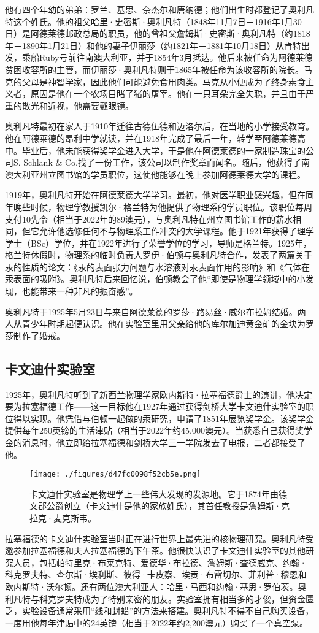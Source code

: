 他有四个年幼的弟弟：罗兰、基思、奈杰尔和唐纳德；他们出生时都登记了奥利凡特这个姓氏。他的祖父哈里·史密斯·奥利凡特（1848年11月7日－1916年1月30日）是阿德莱德邮政总局的职员，他的曾祖父詹姆斯·史密斯·奥利凡特（约1818年－1890年1月21日）和他的妻子伊丽莎（约1821年－1881年10月18日）从肯特出发，乘船Ruby号前往南澳大利亚，并于1854年3月抵达。他后来被任命为阿德莱德贫困收容所的主管，而伊丽莎·奥利凡特则于1865年被任命为该收容所的院长。马克的父母是神智学家，因此他们可能避免食用肉类。马克从小便成为了终身素食主义者，原因是他在一个农场目睹了猪的屠宰。他在一只耳朵完全失聪，并且由于严重的散光和近视，他需要戴眼镜。

奥利凡特最初在家人于1910年迁往古德伍德和迈洛尔后，在当地的小学接受教育。他在阿德莱德的昂利中学就读，并在1918年完成了最后一年，转学至阿德莱德高中。毕业后，他未能获得奖学金进入大学，于是他在阿德莱德的一家制造珠宝的公司S. Schlank & Co.找了一份工作，该公司以制作奖章而闻名。随后，他获得了南澳大利亚州立图书馆的学员职位，这使他能够在晚上参加阿德莱德大学的课程。

1919年，奥利凡特开始在阿德莱德大学学习。最初，他对医学职业感兴趣，但在同年晚些时候，物理学教授凯尔·格兰特为他提供了物理系的学员职位。该职位每周支付10先令（相当于2022年的89澳元），与奥利凡特在州立图书馆工作的薪水相同，但它允许他选修任何不与物理系工作冲突的大学课程。他于1921年获得了理学学士（BSc）学位，并在1922年进行了荣誉学位的学习，导师是格兰特。1925年，格兰特休假时，物理系的临时负责人罗伊·伯顿与奥利凡特合作，发表了两篇关于汞的性质的论文：《汞的表面张力问题与水溶液对汞表面作用的影响》和《气体在汞表面的吸附》。奥利凡特后来回忆说，伯顿教会了他“即使是物理学领域中的小发现，也能带来一种非凡的振奋感”。

奥利凡特于1925年5月23日与来自阿德莱德的罗莎·路易丝·威尔布拉姆结婚。两人从青少年时期起便认识。他在实验室里用父亲给他的库尔加迪黄金矿的金块为罗莎制作了婚戒。
\subsection{卡文迪什实验室}
1925年，奥利凡特听到了新西兰物理学家欧内斯特·拉塞福德爵士的演讲，他决定要为拉塞福德工作——这一目标他在1927年通过获得剑桥大学卡文迪什实验室的职位得以实现。他凭借与伯顿一起做的汞研究，申请了1851年展览奖学金。该奖学金提供每年250英镑的生活津贴（相当于2022年约45,000澳元）。当获悉自己获得奖学金的消息时，他立即给拉塞福德和剑桥大学三一学院发去了电报，二者都接受了他。
\begin{figure}[ht]
\centering
\texttt{[image: ./figures/d47fc0098f52cb5e.png]}
\caption{卡文迪什实验室是物理学上一些伟大发现的发源地。它于1874年由德文郡公爵创立（卡文迪什是他的家族姓氏），其首任教授是詹姆斯·克拉克·麦克斯韦。} \label{fig_MKalft_2}
\end{figure}
拉塞福德的卡文迪什实验室当时正在进行世界上最先进的核物理研究。奥利凡特受邀参加拉塞福德和夫人拉塞福德的下午茶。他很快认识了卡文迪什实验室的其他研究人员，包括帕特里克·布莱克特、爱德华·布拉德、詹姆斯·查德威克、约翰·科克罗夫特、查尔斯·埃利斯、彼得·卡皮察、埃贡·布雷切尔、菲利普·穆恩和欧内斯特·沃尔顿。还有两位澳大利亚人：哈里·马西和约翰·基思·罗伯茨。奥利凡特与科克罗夫特成为了特别亲密的朋友。实验室拥有相当多的才俊，但资金匮乏，实验设备通常采用“线和封蜡”的方法来搭建。奥利凡特不得不自己购买设备，一度用他每年津贴中的24英镑（相当于2022年约2,200澳元）购买了一个真空泵。

